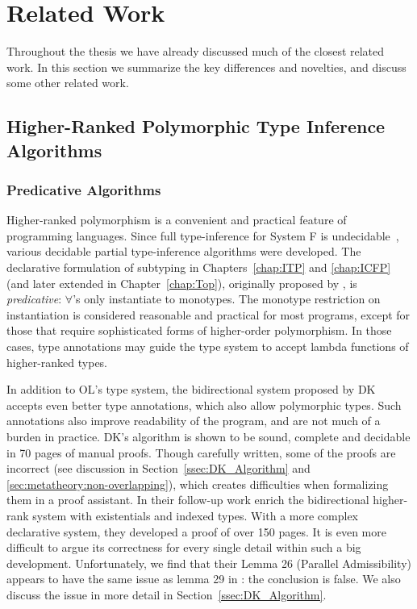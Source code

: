 \chapter{Related Work}
\label{chap:related}

Throughout the thesis we have already discussed much of the closest related work.
In this section we summarize the key differences and novelties,
and discuss some other related work.

\section{Higher-Ranked Polymorphic Type Inference Algorithms}

\subsection{Predicative Algorithms}

Higher-ranked polymorphism is a convenient and practical feature of
programming languages.  Since full type-inference for System F is
undecidable~\citep{wells1999typability}, various decidable partial
type-inference algorithms were developed.
The declarative formulation of subtyping in Chapters~\ref{chap:ITP} and \ref{chap:ICFP}
(and later extended in Chapter~\ref{chap:Top}),
originally proposed by \citet{odersky1996putting}, is \emph{predicative}:
$\forall$'s only instantiate to monotypes.  The monotype restriction
on instantiation is considered reasonable and practical for most
programs, except for those that require sophisticated forms of
higher-order polymorphism.
In those cases, type annotations may guide the type system to
accept lambda functions of higher-ranked types.

In addition to OL's type system,
the bidirectional system proposed by DK~\citep{dunfield2013complete}
accepts even better type annotations, which also allow polymorphic types.
Such annotations also improve readability of the program,
and are not much of a burden in practice.
DK's algorithm is shown to be sound, complete and decidable in 70 pages of manual proofs.
Though carefully written, some of the proofs are incorrect
(see discussion in Section~\ref{ssec:DK_Algorithm} and
\ref{sec:metatheory:non-overlapping}),
which creates difficulties when formalizing them in a proof assistant.
In their follow-up work \citet{DunfieldIndexed} enrich the bidirectional higher-rank system with
existentials and indexed types.
With a more complex declarative system, they developed a proof of over 150 pages.
It is even more difficult to argue its correctness for every single detail
within such a big development.
Unfortunately, we find that their Lemma 26 (Parallel Admissibility) appears to have the same issue 
as lemma 29 in \citep{dunfield2013complete}: the conclusion is false. We also discuss
the issue in more detail in Section~\ref{ssec:DK_Algorithm}.

